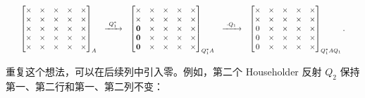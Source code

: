 \documentclass[UTF8,fontset=none,12pt]{ctexart}
\begin{document}
\[
\resizebox{0.98\textwidth}{!}{$
\begin{array}{c@{\quad\xrightarrow{\ Q_1^*\ }\quad}c@{\quad\xrightarrow{\ \cdot Q_1\ }\quad}c}
\begin{bmatrix}
\times&\times&\times&\times&\times\\
\times&\times&\times&\times&\times\\
\times&\times&\times&\times&\times\\
\times&\times&\times&\times&\times\\
\times&\times&\times&\times&\times
\end{bmatrix}_{A}
&
\begin{bmatrix}
\times&\times&\times&\times&\times\\
\mathbf{\times}&\mathbf{\times}&\mathbf{\times}&\mathbf{\times}&\mathbf{\times}\\
\mathbf{0}&\mathbf{\times}&\mathbf{\times}&\mathbf{\times}&\mathbf{\times}\\
\mathbf{0}&\mathbf{\times}&\mathbf{\times}&\mathbf{\times}&\mathbf{\times}\\
\mathbf{0}&\mathbf{\times}&\mathbf{\times}&\mathbf{\times}&\mathbf{\times}
\end{bmatrix}_{Q_1^*A}
&
\begin{bmatrix}
\times&\mathbf{\times}&\mathbf{\times}&\mathbf{\times}&\mathbf{\times}\\
\times&\mathbf{\times}&\mathbf{\times}&\mathbf{\times}&\mathbf{\times}\\
0&\mathbf{\times}&\mathbf{\times}&\mathbf{\times}&\mathbf{\times}\\
0&\mathbf{\times}&\mathbf{\times}&\mathbf{\times}&\mathbf{\times}\\
0&\mathbf{\times}&\mathbf{\times}&\mathbf{\times}&\mathbf{\times}
\end{bmatrix}_{Q_1^*AQ_1}.
\end{array}$}
\]

重复这个想法，可以在后续列中引入零。例如，第二个 Householder
反射 $Q_2$ 保持第一、第二行和第一、第二列不变：
\end{document}
